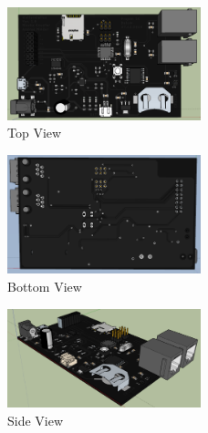 \begin{appendix}
\begin{figure}[hbtp]
\centering
\includegraphics[width=0.5\textwidth]{graphics/3D_Model/3d_topview.PNG}
\caption{Top View}
\label{fig:3d_topview}
\end{figure}

\begin{figure}[hbtp]
\centering
\includegraphics[width=0.5\textwidth]{graphics/3D_Model/3d_groundview.PNG}
\caption{Bottom View}
\label{fig:3d_bottomview}
\end{figure}

\begin{figure}[hbtp]
\centering
\includegraphics[width=0.5\textwidth]{graphics/3D_Model/3d_dioganalFrontRight_view.PNG}
\caption{Side View}
\label{fig:3d_sideview}
\end{figure}


\end{appendix}

